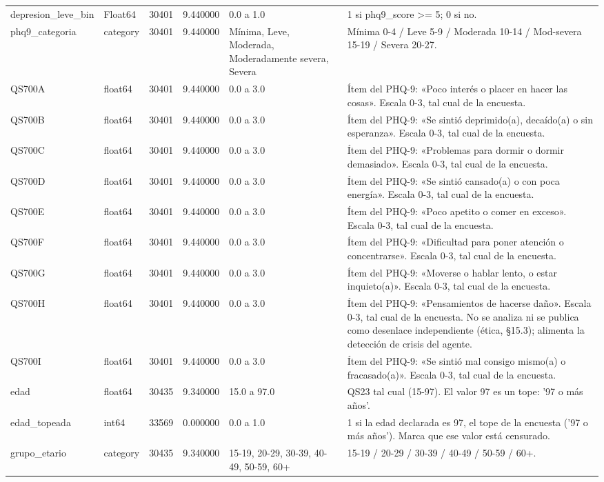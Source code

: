 \begin{longtable}{llrrll}
depresion\_leve\_bin & Float64 & 30401 & 9.440000 & 0.0 a 1.0 & 1 si phq9\_score >= 5; 0 si no. \\
phq9\_categoria & category & 30401 & 9.440000 & Mínima, Leve, Moderada, Moderadamente severa, Severa & Mínima 0-4 / Leve 5-9 / Moderada 10-14 / Mod-severa 15-19 / Severa 20-27. \\
QS700A & float64 & 30401 & 9.440000 & 0.0 a 3.0 & Ítem del PHQ-9: «Poco interés o placer en hacer las cosas». Escala 0-3, tal cual de la encuesta. \\
QS700B & float64 & 30401 & 9.440000 & 0.0 a 3.0 & Ítem del PHQ-9: «Se sintió deprimido(a), decaído(a) o sin esperanza». Escala 0-3, tal cual de la encuesta. \\
QS700C & float64 & 30401 & 9.440000 & 0.0 a 3.0 & Ítem del PHQ-9: «Problemas para dormir o dormir demasiado». Escala 0-3, tal cual de la encuesta. \\
QS700D & float64 & 30401 & 9.440000 & 0.0 a 3.0 & Ítem del PHQ-9: «Se sintió cansado(a) o con poca energía». Escala 0-3, tal cual de la encuesta. \\
QS700E & float64 & 30401 & 9.440000 & 0.0 a 3.0 & Ítem del PHQ-9: «Poco apetito o comer en exceso». Escala 0-3, tal cual de la encuesta. \\
QS700F & float64 & 30401 & 9.440000 & 0.0 a 3.0 & Ítem del PHQ-9: «Dificultad para poner atención o concentrarse». Escala 0-3, tal cual de la encuesta. \\
QS700G & float64 & 30401 & 9.440000 & 0.0 a 3.0 & Ítem del PHQ-9: «Moverse o hablar lento, o estar inquieto(a)». Escala 0-3, tal cual de la encuesta. \\
QS700H & float64 & 30401 & 9.440000 & 0.0 a 3.0 & Ítem del PHQ-9: «Pensamientos de hacerse daño». Escala 0-3, tal cual de la encuesta. No se analiza ni se publica como desenlace independiente (ética, §15.3); alimenta la detección de crisis del agente. \\
QS700I & float64 & 30401 & 9.440000 & 0.0 a 3.0 & Ítem del PHQ-9: «Se sintió mal consigo mismo(a) o fracasado(a)». Escala 0-3, tal cual de la encuesta. \\
edad & float64 & 30435 & 9.340000 & 15.0 a 97.0 & QS23 tal cual (15-97). El valor 97 es un tope: '97 o más años'. \\
edad\_topeada & int64 & 33569 & 0.000000 & 0.0 a 1.0 & 1 si la edad declarada es 97, el tope de la encuesta ('97 o más años'). Marca que ese valor está censurado. \\
grupo\_etario & category & 30435 & 9.340000 & 15-19, 20-29, 30-39, 40-49, 50-59, 60+ & 15-19 / 20-29 / 30-39 / 40-49 / 50-59 / 60+. \\

\end{longtable}
